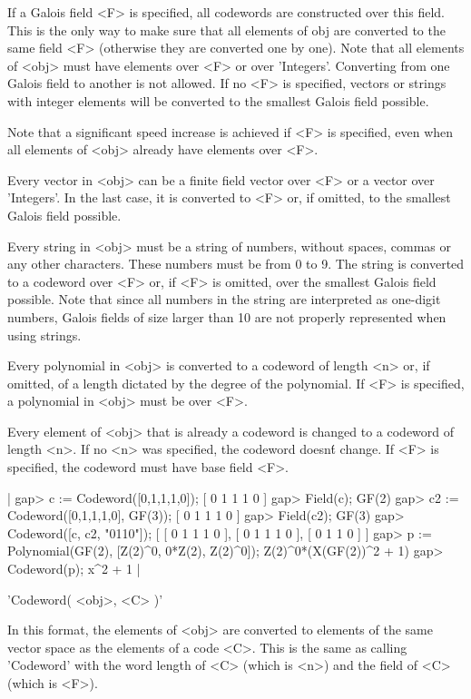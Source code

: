 If a  Galois field <F>  is specified, all  codewords are constructed over
this field. This is the  only way to  make sure that  all elements of obj
are converted to the same field <F> (otherwise they  are converted one by
one). Note that all elements of <obj> must have elements over <F> or over
'Integers'.   Converting  from  one  Galois    field to another    is not
allowed. If no <F> is specified, vectors or strings with integer elements
will be converted to the smallest Galois field possible.

Note that a significant speed  increase is achieved  if <F> is specified,
even when all elements of <obj> already have elements over <F>.

Every vector in <obj> can be a  finite field vector over  <F> or a vector
over 'Integers'. In the last case, it is converted to <F> or, if omitted,
to the smallest Galois field possible.

Every string in <obj> must be a string of numbers, without spaces, commas
or any other characters. These numbers must be from 0 to 9. The string is
converted to a codeword over <F> or, if <F> is omitted, over the smallest
Galois  field  possible. Note that since  all  numbers in  the string are
interpreted as one-digit  numbers, Galois fields of  size larger than  10
are not properly represented when using strings.

Every polynomial in <obj> is converted to a codeword of length <n> or, if
omitted, of a length dictated by the degree of the  polynomial. If <F> is
specified, a polynomial in <obj> must be over <F>.

Every  element of  <obj>  that is already   a codeword  is  changed to  a
codeword of  length <n>. If  no <n> was  specified, the codeword doesn\'t
change. If <F> is specified, the codeword must have base field <F>.

|    gap> c := Codeword([0,1,1,1,0]);
    [ 0 1 1 1 0 ]
    gap> Field(c);
    GF(2)
    gap> c2 := Codeword([0,1,1,1,0], GF(3));
    [ 0 1 1 1 0 ]
    gap> Field(c2);
    GF(3)
    gap> Codeword([c, c2, "0110"]);
    [ [ 0 1 1 1 0 ], [ 0 1 1 1 0 ], [ 0 1 1 0 ] ]
    gap> p := Polynomial(GF(2), [Z(2)^0, 0*Z(2), Z(2)^0]);
    Z(2)^0*(X(GF(2))^2 + 1)
    gap> Codeword(p);
    x^2 + 1 |

'Codeword( <obj>, <C> )'

In this format, the  elements of <obj>  are converted to elements  of the
same vector space as the   elements of a code   <C>. This is the same  as
calling  'Codeword' with the word length  of <C>  (which  is <n>) and the
field of <C> (which is <F>).

